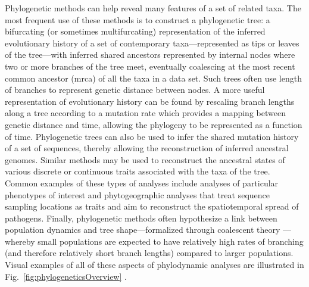 
Phylogenetic methods can help reveal many features of a set of related taxa.
The most frequent use of these methods is to construct a phylogenetic tree: a bifurcating (or sometimes multifurcating) representation of the inferred evolutionary history of a set of contemporary taxa---represented as tips or leaves of the tree---with inferred shared ancestors represented by internal nodes where two or more branches of the tree meet, eventually coalescing at the most recent common ancestor (\gls{mrca}) of all the taxa in a data set.
Such trees often use length of branches to represent genetic distance between nodes.
A more useful representation of evolutionary history can be found by rescaling branch lengths along a tree according to a mutation rate which provides a mapping between genetic distance and time, allowing the phylogeny to be represented as a function of time.
Phylogenetic trees can also be used to infer the shared mutation history of a set of sequences, thereby allowing the reconstruction of inferred ancestral genomes.
Similar methods may be used to reconstruct the ancestral states of various discrete or continuous traits associated with the taxa of the tree.
Common examples of these types of analyses include analyses of particular phenotypes of interest and phytogeographic analyses that treat sequence sampling locations as traits and aim to reconstruct the spatiotemporal spread of pathogens.
Finally, phylogenetic methods often hypothesize a link between population dynamics and tree shape---formalized through coalescent theory \cite{Kingman1982}---whereby small populations are expected to have relatively high rates of branching (and therefore relatively short branch lengths) compared to larger populations.
Visual examples of all of these aspects of phylodynamic analyses are illustrated in Fig.~\ref{fig:phylogeneticsOverview} \cite{pybus2009evolutionary}.

